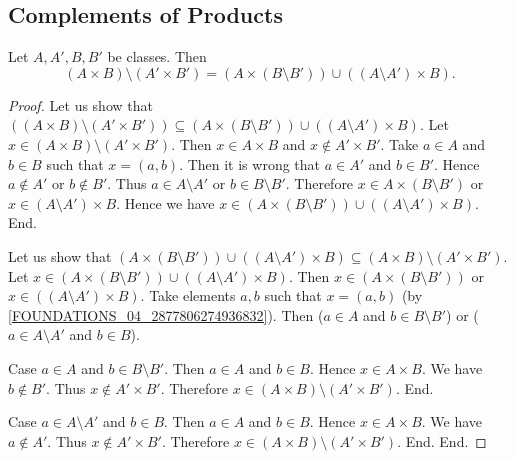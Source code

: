 \documentclass[10pt]{article}
\begin{document}
  \subsection{Complements of Products}

  \begin{forthel}
    \begin{proposition}
      Let $A, A', B, B'$ be classes.
      Then \[ (A \times B) \setminus (A' \times B') =
      (A \times (B \setminus B')) \cup ((A \setminus A') \times B). \]
    \end{proposition}
    \begin{proof}
      Let us show that $((A \times B) \setminus (A' \times B')) \subseteq
      (A \times (B \setminus B')) \cup ((A \setminus A') \times B)$.
        Let $x \in (A \times B) \setminus (A' \times B')$.
        Then $x \in A \times B$ and $x \notin A' \times B'$.
        Take $a \in A$ and $b \in B$ such that $x = (a, b)$.
        Then it is wrong that $a \in A'$ and $b \in B'$.
        Hence $a \notin A'$ or $b \notin B'$.
        Thus $a \in A \setminus A'$ or $b \in B \setminus B'$.
        Therefore $x \in A \times (B \setminus B')$ or
        $x \in (A \setminus A') \times B$.
        Hence we have $x \in (A \times (B \setminus B')) \cup
        ((A \setminus A') \times B)$.
      End.

      Let us show that $(A \times (B \setminus B')) \cup ((A \setminus A') \times B)
      \subseteq (A \times B) \setminus (A' \times B')$.
        Let $x \in (A \times (B \setminus B')) \cup
        ((A \setminus A') \times B)$.
        Then $x \in (A \times (B \setminus B'))$ or
        $x \in ((A \setminus A') \times B)$.
        Take elements $a,b$ such that $x = (a, b)$ (by \cref{FOUNDATIONS_04_2877806274936832}).
        Then ($a \in A$ and $b \in B \setminus B'$) or
        ($a \in A \setminus A'$ and $b \in B$).

        Case $a \in A$ and $b \in B \setminus B'$.
          Then $a \in A$ and $b \in B$.
          Hence $x \in A \times B$.
          We have $b \notin B'$.
          Thus $x \notin A' \times B'$.
          Therefore $x \in (A \times B) \setminus (A' \times B')$.
        End.

        Case $a \in A \setminus A'$ and $b \in B$.
          Then $a \in A$ and $b \in B$.
          Hence $x \in A \times B$.
          We have $a \notin A'$.
          Thus $x \notin A' \times B'$.
          Therefore $x \in (A \times B) \setminus (A' \times B')$.
        End.
      End.
    \end{proof}
  \end{forthel}
\end{document}

